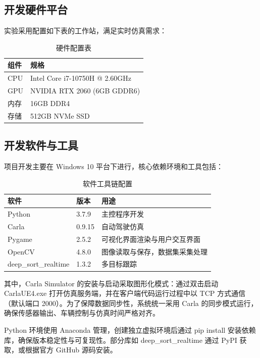 \subsection{开发硬件平台}

实验采用配置如下表的工作站，满足实时仿真需求：

\begin{table}[htbp]
  \caption{硬件配置表}
  \label{tab:hardware_config}
  \centering
  \begin{tabular}{ll}
    \toprule
    组件 & 规格 \\
    \midrule
    CPU & Intel Core i7-10750H @ 2.60GHz \\
    GPU & NVIDIA RTX 2060 (6GB GDDR6) \\
    内存 & 16GB DDR4 \\
    存储 & 512GB NVMe SSD \\
    \bottomrule
  \end{tabular}
\end{table}

\subsection{开发软件与工具}

项目开发主要在 Windows 10 平台下进行，核心依赖环境和工具包括：

\begin{table}[htbp]
  \caption{软件工具链配置}
  \label{tab:software_stack}
  \centering
  \begin{tabular}{lll}
    \toprule
    软件 & 版本 & 用途 \\
    \midrule
    Python & 3.7.9 & 主控程序开发 \\
    Carla & 0.9.15 & 自动驾驶仿真 \\
    Pygame & 2.5.2 & 可视化界面渲染与用户交互界面 \\
    OpenCV & 4.8.0 & 图像读取与保存，数据集采集处理 \\
    deep\_sort\_realtime & 1.3.2 & 多目标跟踪 \\
    \bottomrule
  \end{tabular}
\end{table}

其中，Carla Simulator 的安装与启动采取图形化模式：通过双击启动CarlaUE4.exe 打开仿真服务端，并在客户端代码运行过程中以 TCP 方式通信（默认端口 2000）。为了保障数据同步性，系统统一采用 Carla 的同步模式运行，确保传感器输出、车辆控制与仿真时间严格对齐。

Python 环境使用 Anaconda 管理，创建独立虚拟环境后通过 pip install 安装依赖库，确保版本稳定性与可复现性。部分库如 deep\_sort\_realtime 通过 PyPI 获取，或根据官方 GitHub 源码安装。




\begin{tabular}{l l}
\end{tabular}
